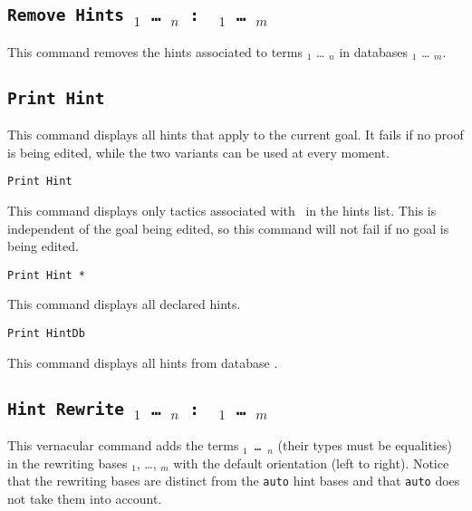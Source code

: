 \begin{coq_example*}
\subsection{\tt Remove Hints \term$_1$ \mbox{\dots} \term$_n$ :~ \ident$_1$
  \mbox{\dots} \ident$_m$}
\label{RemoveHints}

This command removes the hints associated to terms \term$_1$ \mbox{\dots}
\term$_n$ in databases \ident$_1$ \mbox{\dots} \ident$_m$.

\subsection{\tt Print Hint}
\label{PrintHint}

This command displays all hints that apply to the current goal. It
fails if no proof is being edited, while the two variants can be used at
every moment.

\begin{Variants}

\item {\tt Print Hint \ident}

 This command displays only tactics associated with \ident\ in the
 hints list. This is independent of the goal being edited, so this
 command will not fail if no goal is being edited.

\item {\tt Print Hint *}

  This command displays all declared hints.

\item {\tt Print HintDb \ident}
\label{PrintHintDb}

 This command displays all hints from database \ident.

\end{Variants}

\subsection{\tt Hint Rewrite \term$_1$ \mbox{\dots} \term$_n$ :~ \ident$_1$ \mbox{\dots} \ident$_m$}
\label{HintRewrite}

This vernacular command adds the terms {\tt \term$_1$ \mbox{\dots} \term$_n$}
(their types must be equalities) in the rewriting bases \ident$_1$, \dots, \ident$_m$
with the default orientation (left to right). Notice that the
rewriting bases are distinct from the {\tt auto} hint bases and that
{\tt auto} does not take them into account.


\end{coq_example*}
